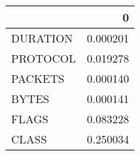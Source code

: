 \begin{tabular}{lr}
\toprule
{} &         0 \\
\midrule
DURATION &  0.000201 \\
PROTOCOL &  0.019278 \\
PACKETS  &  0.000140 \\
BYTES    &  0.000141 \\
FLAGS    &  0.083228 \\
CLASS    &  0.250034 \\
\bottomrule
\end{tabular}
